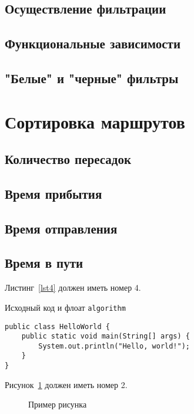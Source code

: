 \subsection{Осуществление фильтрации}

\subsection{Функциональные зависимости}

\subsection{"Белые" и "черные" фильтры}

\section{Сортировка маршрутов}

\subsection{Количество пересадок}

\subsection{Время прибытия}

\subsection{Время отправления}

\subsection{Время в пути}
Листинг~\ref{lst4} должен иметь номер 4.

\begin{algorithm}[!h]
\caption{Исходный код и флоат \texttt{algorithm}}\label{lst4}
\begin{lstlisting}
public class HelloWorld {
	public static void main(String[] args) {
		System.out.println("Hello, world!");
	}
}
\end{lstlisting}
\end{algorithm}

Рисунок~\ref{fig2} должен иметь номер 2.

\begin{figure}[!h]
\caption{Пример рисунка}\label{fig2}
\centering
{}
\end{figure}

